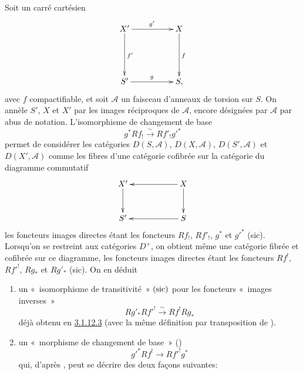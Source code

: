 \documentclass[10pt]{../fichiers-configuration-latex/smfart}
\begin{document}
\subsubsection{}
Soit un carré cartésien
$$
\xymatrix@=1.75cm{
X' \ar[r]^{g'} \ar[d]^{f'}& X \ar[d]^{f}\\
S' \ar[r]^{g}& S,
}
$$
avec $f$ compactifiable, et soit $\mathcal{A}$ un faisceau d'anneaux
de torsion sur $S$. On annèle $S'$, $X$ et $X'$ par les images
réciproques de $\mathcal{A}$, encore désignées\pageoriginale 
par $\mathcal{A}$ par abus de notation. L'isomorphisme de changement de base
\begin{equation*}
g^{\ast}Rf_{!}\xrightarrow{\sim} Rf'_{!}{g'}^{\ast}\tag{3.1.14.1}
\end{equation*}%
permet de considérer les catégories $D(S,\mathcal{A})$,
$D(X,\mathcal{A})$, $D(S',\mathcal{A})$ et $D(X',\mathcal{A})$ comme
les fibres d'une catégorie cofibrée sur la catégorie du diagramme
commutatif
$$
\xymatrix@C=2cm@R=1cm{
X' \ar[d]& X\ar[l]\ar[d]\\
S' & S\ar[l],
}
$$
les foncteurs images directes étant les foncteurs $Rf_{!}$, $Rf'_{!}$,
$g^{\ast}$ et ${g'}^{\ast}$ (sic). Lorsqu'on se restreint aux
catégories $D^{+}$, on obtient même une catégorie fibrée et cofibrée
sur ce diagramme, les foncteurs images directes étant les foncteurs
$Rf^{!}$, $R{f'}^{!}$, $Rg_{\ast}$ et $Rg'_{\ast}$ (sic). On en
déduit
\begin{enumerate}
\renewcommand{\theenumi}{\alph{enumi}}
\renewcommand{\labelenumi}{\theenumi)}
\item un « isomorphisme de transitivité »  $(\operatorname{sic})$ pour les
foncteurs « images inverses »
$$
Rg'_{\ast} R{f'}^{!}\xrightarrow{\sim} Rf^{!}Rg_{\ast}
$$
déjà obtenu en \hyperref[XVIII.cor3.1.12.3]{3.1.12.3} (avec la même définition par
transposition de ).

\item un « morphisme de changement de base »  ()
\begin{equation*}
{g'}^{\ast}Rf^{!}\longrightarrow R{f'}^{!}g^{\ast}\tag{3.1.14.2}
\end{equation*}%
qui, d'après \loccit, peut se décrire des deux façons suivantes:
\end{enumerate}
\end{document}
